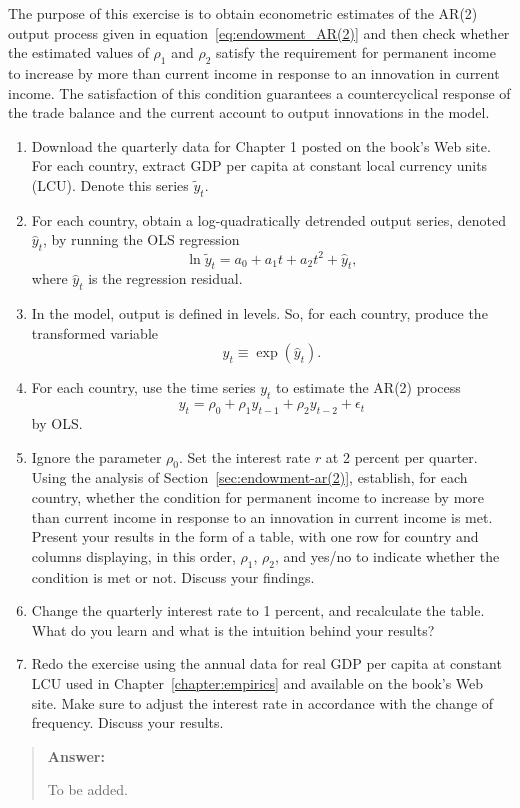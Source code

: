 \begin{exercise} 
The purpose of this exercise is to obtain econometric estimates of the AR(2) output process given in equation~\eqref{eq:endowment_AR(2)} and then check whether the estimated values of $\rho_1$ and $\rho_2$ satisfy the requirement for permanent income to increase by more than current income in response to an innovation in current income.  The satisfaction of this condition guarantees a countercyclical response of the trade balance and the current account to output innovations in the model. 

\begin{enumerate}
\item  Download the quarterly data for  Chapter 1 posted on the book's Web site.  For each country, extract GDP per capita at constant local currency units (LCU). Denote this series $\tilde{y}_t$.    
\item  For each country,  obtain a log-quadratically detrended output series, denoted $\hat{y}_t$, by running the OLS regression 
\[
\ln \tilde{y}_t = a_0 + a_1 t + a_2 t^2 + \hat{y}_t,
\]
where $\hat{y}_t$ is the regression residual. 
\item In the model, output is defined in levels. So, for each country, 
produce the transformed   variable 
\[
y_t \equiv \exp(\hat{y}_t). 
\]
\item For each country, use the time series $y_t$ to estimate the AR(2) process
\[
y_{t} = \rho_0 +  \rho_1 y_{t-1} + \rho_2 y_{t-2} + \epsilon_t
\]
by OLS. 
\item Ignore the parameter $\rho_0$. Set the interest rate $r$ at 2 percent per quarter. 
  Using the analysis of Section~\ref{sec:endowment-ar(2)}, establish, for each country, whether the condition for permanent income to increase by more than current income in response to an innovation in current income is met. Present your results in the form of a table, with one row for country and columns displaying,  in this order, $\rho_1$, $\rho_2$, and yes/no to indicate whether the condition is met or not. Discuss your findings. 
\item Change the quarterly interest rate to 1 percent, and recalculate the table. What do you learn and what is the intuition behind your results? 
\item Redo the exercise using the annual data for real GDP per capita at constant LCU   used in Chapter~\ref{chapter:empirics} and available on the book's Web site. 
 Make sure to adjust the interest rate in accordance with the change of frequency. Discuss your results.
\end{enumerate}
\begin{quote} 
{\bf Answer:}

To be added. 
\end{quote}
\end{exercise}

